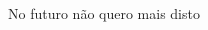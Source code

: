 \documentclass{llncs}
\begin{document}
No futuro não quero mais disto

\newpage
%

\begin{thebibliography}{1}





\end{thebibliography}
\end{document}
